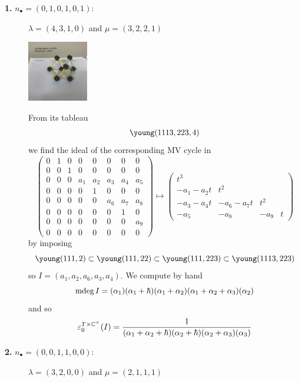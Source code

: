 \documentclass[11pt]{article}
\begin{document}
\begin{description}
    \item[{\bf 1.} $n_\bullet = (0,1,0,1,0,1)$:] $\lambda = (4,3,1,0)$ and $\mu = (3,2,2,1)$ 
    \hfill
 
        \includegraphics[height=100px]{img/3212.jpeg}

    From its tableau 
    $$
    \young(1113,223,4)
    $$
    we find the ideal of the corresponding MV cycle in
    {\small$$\begin{pmatrix}
        0&1&0&0&0&0&0&0\\
        0&0&1&0&0&0&0&0\\
        0&0&0&{a}_{1}&{a}_{2}&{a}_{3}&{a}_{4}&{a}_{5}\\
        0&0&0&0&1&0&0&0\\
        0&0&0&0&0&{a}_{6}&{a}_{7}&{a}_{8}\\
        0&0&0&0&0&0&1&0\\
        0&0&0&0&0&0&0&{a}_{9}\\
        0&0&0&0&0&0&0&0\end{pmatrix}
        \mapsto \begin{pmatrix}
            t^3 \\
            -a_1 -a_2t & t^2 \\
            -a_3 -a_4t & -a_6 - a_7 t & t^2 \\
            -a_5 & -a_8 & -a_9 & t 
        \end{pmatrix}
    $$}
    by imposing 
    $$
    \young(111,2)\subset\young(111,22)\subset\young(111,223)\subset\young(1113,223)
    $$
    so $I = \left({a}_{1},{a}_{2},{a}_{6},{a}_{3},{a}_{4}\right)$. We compute by hand 
    $$
    \operatorname{mdeg} I = (\alpha_1)(\alpha_1 + \hbar) (\alpha_1 + \alpha_2) (\alpha_1 + \alpha_2 + \alpha_3) (\alpha_2 )
    $$
    and so 
    $$
    \varepsilon^{T\times\mathbb C^\times}_0(I) = \frac{1}{(\alpha_1 + \alpha_2 + \hbar)(\alpha_2 + \hbar) (\alpha_2 + \alpha_3) (\alpha_3 )}
    $$
    \item[{\bf 2.} $n_\bullet = (0,0,1,1,0,0)$:] $\lambda = (3,2,0,0)$ and $\mu = (2,1,1,1)$ \hfill 


\end{description}
\end{document}
